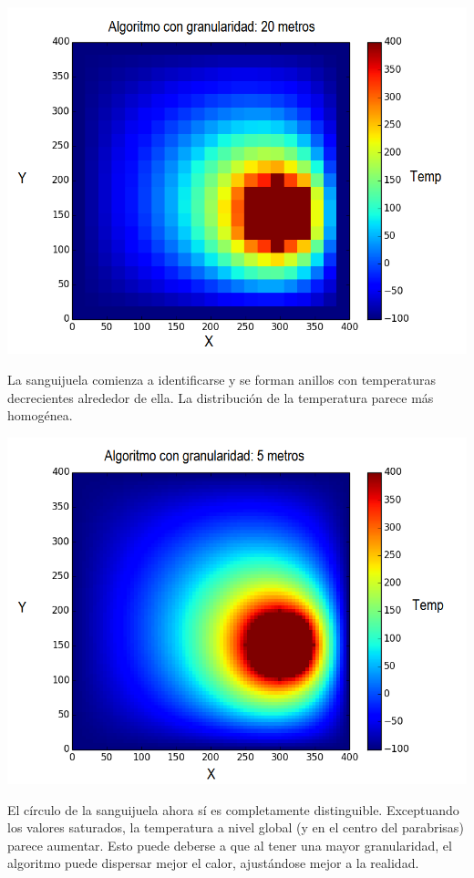 	\begin{center}
		\includegraphics[width=\textwidth]{./img/granularidad/g20_t400_sinkill.png}
	\end{center}

	La sanguijuela comienza a identificarse y se forman anillos con temperaturas decrecientes alrededor de ella. La distribución de la temperatura parece más homogénea.

	\begin{center}
		\includegraphics[width=\textwidth]{./img/granularidad/g5_t400_sinkill.png}
	\end{center}

	El círculo de la sanguijuela ahora sí es completamente distinguible. Exceptuando los valores saturados, la temperatura a nivel global (y en el centro del parabrisas) parece aumentar. Esto puede deberse a que al tener una mayor granularidad, el algoritmo puede dispersar mejor el calor, ajustándose mejor a la realidad.

